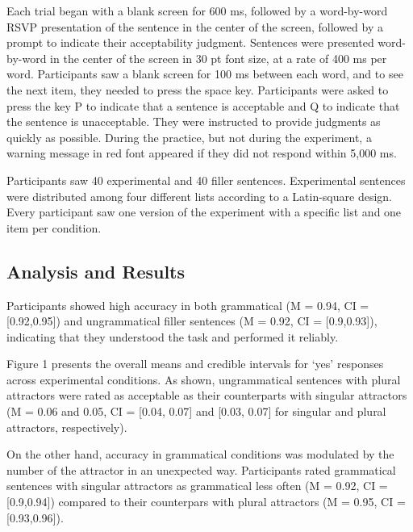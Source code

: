 \documentclass[
  authoryear,
  preprint]{elsarticle}
\begin{document}
Each trial began with a blank screen for 600 ms, followed by a
word-by-word RSVP presentation of the sentence in the center of the
screen, followed by a prompt to indicate their acceptability judgment.
Sentences were presented word-by-word in the center of the screen in 30
pt font size, at a rate of 400 ms per word. Participants saw a blank
screen for 100 ms between each word, and to see the next item, they
needed to press the space key. Participants were asked to press the key
P to indicate that a sentence is acceptable and Q to indicate that the
sentence is unacceptable. They were instructed to provide judgments as
quickly as possible. During the practice, but not during the experiment,
a warning message in red font appeared if they did not respond within
5,000 ms.

Participants saw 40 experimental and 40 filler sentences. Experimental
sentences were distributed among four different lists according to a
Latin-square design. Every participant saw one version of the experiment
with a specific list and one item per condition.

\subsection{Analysis and Results}\label{analysis-and-results}

Participants showed high accuracy in both grammatical (M = 0.94, CI =
{[}0.92,0.95{]}) and ungrammatical filler sentences (M = 0.92, CI =
{[}0.9,0.93{]}), indicating that they understood the task and performed
it reliably.

Figure 1 presents the overall means and credible intervals for `yes'
responses across experimental conditions. As shown, ungrammatical
sentences with plural attractors were rated as acceptable as their
counterparts with singular attractors (M = 0.06 and 0.05, CI = {[}0.04,
0.07{]} and {[}0.03, 0.07{]} for singular and plural attractors,
respectively).

On the other hand, accuracy in grammatical conditions was modulated by
the number of the attractor in an unexpected way. Participants rated
grammatical sentences with singular attractors as grammatical less often
(M = 0.92, CI = {[}0.9,0.94{]}) compared to their counterpars with
plural attractors (M = 0.95, CI = {[}0.93,0.96{]}).
\end{document}
